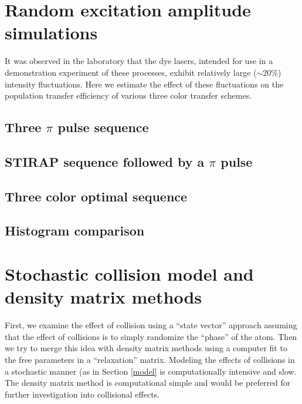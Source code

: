 \section{Random excitation amplitude simulations}
It was observed in the laboratory that the dye lasers, intended for use in a demonstration experiment of these processes, exhibit relatively large ($\sim20\%$) intensity fluctuations. Here we estimate the effect of these fluctuations on the population transfer efficiency of various three color transfer schemes.
\label{random sims}
\subsection{Three $\pi$ pulse sequence}

\subsection{STIRAP sequence followed by a $\pi$ pulse}

\subsection{Three color optimal sequence}

\subsection{Histogram comparison}

\section{Stochastic collision model and density matrix methods}
First, we examine the effect of collision using a ``state vector'' approach assuming that the effect of collisions is to simply randomize the ``phase'' of the atom. Then we try to merge this idea with density matrix methods using a computer fit to the free parameters in a ``relaxation'' matrix. Modeling the effects of collisions in a stochastic manner (as in Section \ref{model} is computationally intensive and slow. The density matrix method is computational simple and would be preferred for further investigation into collisional effects.
\label{density section}
